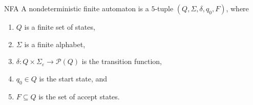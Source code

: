 \begin{Definition}{NFA}{}
    A nondeterministic finite automaton is a $5$-tuple $\left(Q, \Sigma, \delta, q_0, F\right)$, where
    \begin{enumerate}
        \item $Q$ is a finite set of states,
        \item $\Sigma$ is a finite alphabet,
        \item $\delta: Q \times \Sigma_{\varepsilon} \longrightarrow \mathcal{P}(Q)$ is the transition function,
        \item $q_0 \in Q$ is the start state, and
        \item $F \subseteq Q$ is the set of accept states.
    \end{enumerate}
\end{Definition}